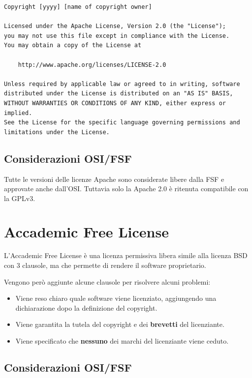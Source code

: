 \begin{lstlisting}[caption=licenza Apache 2.0]
Copyright [yyyy] [name of copyright owner]

Licensed under the Apache License, Version 2.0 (the "License");
you may not use this file except in compliance with the License.
You may obtain a copy of the License at

    http://www.apache.org/licenses/LICENSE-2.0

Unless required by applicable law or agreed to in writing, software
distributed under the License is distributed on an "AS IS" BASIS,
WITHOUT WARRANTIES OR CONDITIONS OF ANY KIND, either express or implied.
See the License for the specific language governing permissions and
limitations under the License.

\end{lstlisting}

\subsection{Considerazioni OSI/FSF}

Tutte le versioni delle licenze Apache sono considerate libere dalla FSF e approvate anche dall'OSI. Tuttavia solo la Apache 2.0 è ritenuta compatibile con la GPLv3.


\section{Accademic Free License}

L'Accademic Free License è una licenza permissiva libera simile alla licenza BSD con 3 clausole, ma che permette di rendere il software proprietario.

Vengono però aggiunte alcune clausole per risolvere alcuni problemi:

\begin{itemize}
	\item Viene reso chiaro quale software viene licenziato, aggiungendo una dichiarazione dopo la definizione del copyright.
	\item Viene garantita la tutela del copyright e dei \textbf{brevetti} del licenziante.
	\item Viene specificato che \textbf{nessuno} dei marchi del licenziante viene ceduto.
\end{itemize}

\subsection{Considerazioni OSI/FSF}

